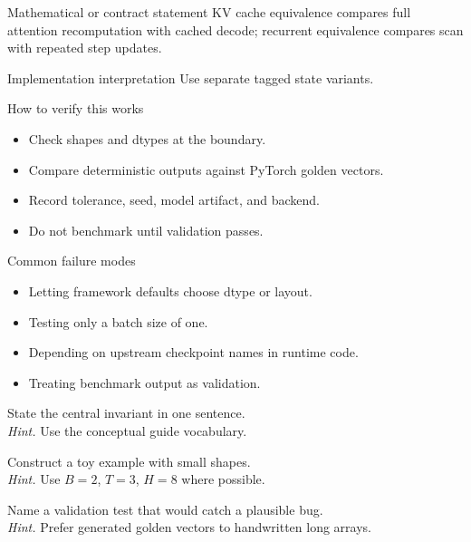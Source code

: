 \begin{definitionbox}{Mathematical or contract statement}
KV cache equivalence compares full attention recomputation with cached decode; recurrent equivalence compares scan with repeated step updates.
\end{definitionbox}

\begin{implementationbox}{Implementation interpretation}
Use separate tagged state variants.
\end{implementationbox}

\begin{verificationbox}{How to verify this works}
\begin{itemize}
\item Check shapes and dtypes at the boundary.
\item Compare deterministic outputs against PyTorch golden vectors.
\item Record tolerance, seed, model artifact, and backend.
\item Do not benchmark until validation passes.
\end{itemize}
\end{verificationbox}

\begin{warningbox}{Common failure modes}
\begin{itemize}
\item Letting framework defaults choose dtype or layout.
\item Testing only a batch size of one.
\item Depending on upstream checkpoint names in runtime code.
\item Treating benchmark output as validation.
\end{itemize}
\end{warningbox}

\begin{chapterexercises}
\item State the central invariant in one sentence.\\
\textit{Hint.} Use the conceptual guide vocabulary.
\item Construct a toy example with small shapes.\\
\textit{Hint.} Use $B=2$, $T=3$, $H=8$ where possible.
\item Name a validation test that would catch a plausible bug.\\
\textit{Hint.} Prefer generated golden vectors to handwritten long arrays.
\end{chapterexercises}

